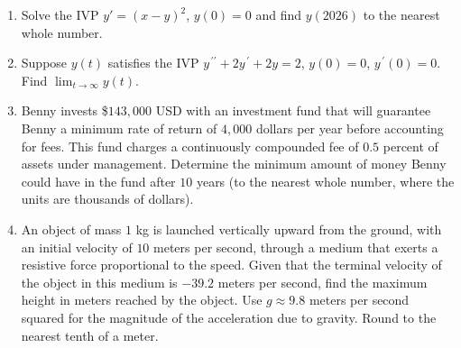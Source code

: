 \documentclass{ximera}
\begin{document}
\begin{enumerate}[label=(\arabic*)]


\item Solve the IVP $\displaystyle y'=(x-y)^{2}$, $y(0)=0$ and find $y(2026)$ to the nearest whole number.







\item Suppose $y(t)$ satisfies the IVP $y^{\,\prime\prime}+2y^{\,\prime}+2y=2$, $y(0)=0$, $y^{\,\prime}(0)=0$.  Find $\displaystyle \lim_{t\rightarrow\infty}y(t)$.


\item Benny invests \$$143,000$ USD with an investment fund that will guarantee Benny a minimum rate of return of $4,000$ dollars per year before accounting for fees. This fund charges a continuously compounded fee of $0.5$ percent of assets under management.   Determine the minimum amount of money Benny could have in the fund after $10$ years (to the nearest whole number, where the units are thousands of dollars).








\newpage

\item  An object of mass $1$ kg is launched vertically upward from the ground, with an initial velocity of $10$ meters per second, through a medium that exerts a resistive force proportional to the speed.  Given that the terminal velocity of the object in this medium is $-39.2$ meters per second, find the maximum height in meters reached by the object.  Use $g\approx 9.8$ meters per second squared for the magnitude of the acceleration due to gravity.  Round to the nearest tenth of a meter.


\end{enumerate}
\end{document}

